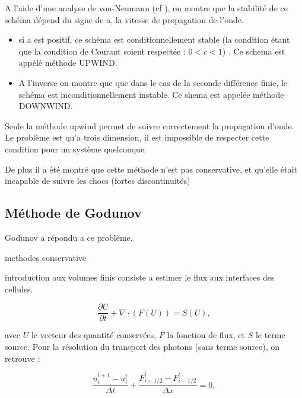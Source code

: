 A l'aide d'une analyse de von-Neumann (cf \cite{toro1999riemann}), on montre que la stabilité de ce schéma dépend du signe de a, la vitesse de propagation de l'onde.

\begin{itemize}
\item si a est positif, ce schéma est conditionnellement stable (la condition étant que la condition de Courant soient respectée : $0<c<1$) .
Ce schema est appélé méthode UPWIND.

\item A l'inverse on montre que que dans le cas de la seconde différence finie, le schéma est inconditionnellement instable. 
Ce shema est appelée méthode DOWNWIND.
\end{itemize}

Seule la méthode upwind permet de suivre correctement la propagation d'onde.
Le problème est qu'a trois dimension, il est impossible de respecter cette condition pour un système quelconque.

De plus il a été montré que cette méthode n'est pas conservative, et qu'elle était incapable de suivre les chocs (fortes discontinuités)

\subsection{Méthode de Godunov}

Godunov  \cite{MR0119433} a répondu a ce problème.

methodes conservative

introduction aux volumes finis
consiste a estimer le flux aux interfaces des cellules.


\begin{equation}
 \frac{\partial U}{\partial t} + \nabla \cdot (F(U)) = S(U), 
\label{eq:rad_generale}
\end{equation}

avec $U$ le vecteur des quantité conservées, $F$ la fonction de flux, et $S$ le terme source. Pour la résolution du transport des photons (sans terme source), on retrouve :

\begin{equation}
\frac{ u^{t+1}_i - u^t_i }{\Delta t} + \frac{ F^t_{i+1/2} - F^t_{i-1/2} }{\Delta x} =0,
\label{eq:rad_solver}
\end{equation}

